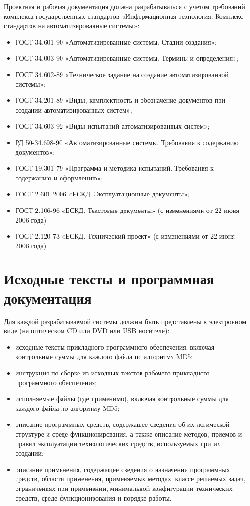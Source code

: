 \documentclass[14pt]{extreport}
\begin{document}
Проектная и рабочая документация должна разрабатываться с учетом
требований комплекса государственных стандартов «Информационная
технология. Комплекс стандартов на автоматизированные системы»:
\begin{itemize}
\item ГОСТ 34.601-90 «Автоматизированные системы. Стадии создания»;
\item ГОСТ 34.003-90 «Автоматизированные системы. Термины и
определения»;
\item ГОСТ 34.602-89 «Техническое задание на создание
автоматизированной системы»;
\item ГОСТ 34.201-89 «Виды, комплектность и обозначение документов при
создании автоматизированных систем»;
\item ГОСТ 34.603-92 «Виды испытаний автоматизированных систем»;
\item РД 50-34.698-90 «Автоматизированные системы. Требования к
содержанию документов»;
\item ГОСТ 19.301-79 «Программа и методика испытаний. Требования к
содержанию и оформлению»;
\item ГОСТ 2.601-2006 «ЕСКД. Эксплуатационные документы»;
\item ГОСТ 2.106-96 «ЕСКД. Текстовые документы» (с изменениями от 22
июня 2006 года);
\item ГОСТ 2.120-73 «ЕСКД. Технический проект» (с изменениями от 22
июня 2006 года).
\end{itemize}

\section{Исходные тексты и программная документация}

Для каждой разрабатываемой системы должны быть представлены в
электронном виде (на оптическом CD или DVD или USB носителе):
\begin{itemize}
\item исходные тексты прикладного программного обеспечения, включая
контрольные суммы для каждого файла по алгоритму MD5;
\item инструкция по сборке из исходных текстов рабочего прикладного
программного обеспечения;
\item исполняемые файлы (где применимо), включая контрольные суммы
для каждого файла по алгоритму MD5;
\item описание программных средств, содержащее сведения об их
логической структуре и среде функционирования, а также описание методов,
приемов и правил эксплуатации технологических средств, используемых при
их создании;
\item описание применения, содержащее сведения о назначении
программных средств, области применения, применяемых методах, классе
решаемых задач, ограничениях при применении, минимальной конфигурации
технических средств, среде функционирования и порядке работы.
\end{itemize}
\end{document}
